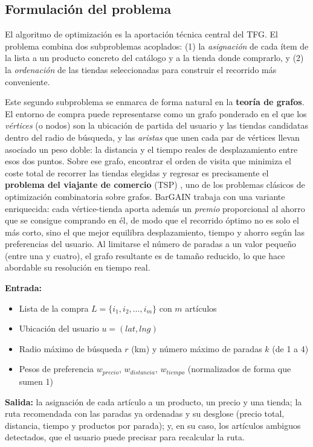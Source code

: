 \subsection{Formulaci\'on del problema}\label{subsec:formulacion}

El algoritmo de optimizaci\'on es la aportaci\'on t\'ecnica central del TFG. El problema combina
dos subproblemas acoplados: (1) la \emph{asignaci\'on} de cada \'item de la lista a un producto
concreto del cat\'alogo y a la tienda donde comprarlo, y (2) la \emph{ordenaci\'on} de las tiendas
seleccionadas para construir el recorrido m\'as conveniente.

Este segundo subproblema se enmarca de forma natural en la \textbf{teor\'ia de grafos}. El entorno
de compra puede representarse como un grafo ponderado en el que los \emph{v\'ertices} (o nodos) son
la ubicaci\'on de partida del usuario y las tiendas candidatas dentro del radio de b\'usqueda, y
las \emph{aristas} que unen cada par de v\'ertices llevan asociado un peso doble: la distancia y el
tiempo reales de desplazamiento entre esos dos puntos. Sobre ese grafo, encontrar el orden de
visita que minimiza el coste total de recorrer las tiendas elegidas y regresar es precisamente el
\textbf{problema del viajante de comercio} (TSP) \cite{tsp_study}, uno de los problemas cl\'asicos
de optimizaci\'on combinatoria sobre grafos. BarGAIN trabaja con una variante enriquecida: cada
v\'ertice-tienda aporta adem\'as un \emph{premio} proporcional al ahorro que se consigue comprando
en \'el, de modo que el recorrido \'optimo no es solo el m\'as corto, sino el que mejor equilibra
desplazamiento, tiempo y ahorro seg\'un las preferencias del usuario. Al limitarse el n\'umero de
paradas a un valor peque\~no (entre una y cuatro), el grafo resultante es de tama\~no reducido, lo
que hace abordable su resoluci\'on en tiempo real.

\textbf{Entrada:}
\begin{itemize}
  \item Lista de la compra $L = \{i_1, i_2, \ldots, i_m\}$ con $m$ art\'iculos
  \item Ubicaci\'on del usuario $u = (lat, lng)$
  \item Radio m\'aximo de b\'usqueda $r$ (km) y n\'umero m\'aximo de paradas $k$ (de 1 a 4)
  \item Pesos de preferencia $w_{precio}$, $w_{distancia}$, $w_{tiempo}$ (normalizados de forma
    que sumen 1)
\end{itemize}

\textbf{Salida:} la asignaci\'on de cada art\'iculo a un producto, un precio y una tienda; la ruta
recomendada con las paradas ya ordenadas y su desglose (precio total, distancia, tiempo y productos
por parada); y, en su caso, los art\'iculos ambiguos detectados, que el usuario puede precisar para
recalcular la ruta.

